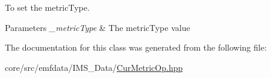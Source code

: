 To set the metricType. 


\begin{DoxyParams}{Parameters}
{\em \_\-metricType} & The metricType value \\
\hline
\end{DoxyParams}


The documentation for this class was generated from the following file:\begin{DoxyCompactItemize}
\item 
core/src/emfdata/IMS\_\-Data/\hyperlink{CurMetricOp_8hpp}{CurMetricOp.hpp}\end{DoxyCompactItemize}
